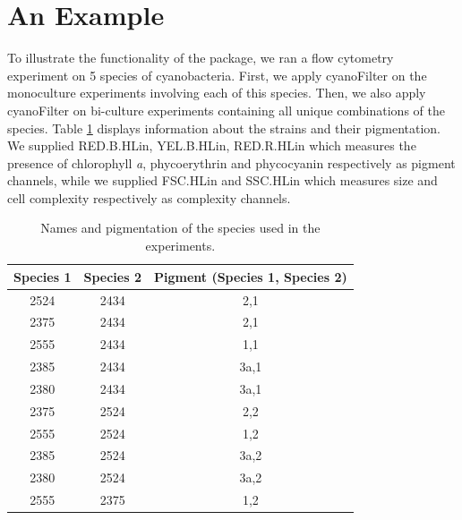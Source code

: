 \documentclass[a4paper,12pt]{extarticle}
\begin{document}


 
 \section*{An Example}
 
 To illustrate the functionality of the package, we ran a flow cytometry experiment on 5 species of cyanobacteria. First, we apply cyanoFilter on the monoculture experiments involving each of this species. Then, we also apply cyanoFilter on bi-culture experiments containing all unique combinations of the species. Table \ref{table:strains} displays information about the strains and their pigmentation. We supplied RED.B.HLin, YEL.B.HLin, RED.R.HLin which measures the presence of chlorophyll \textit{a}, phycoerythrin and phycocyanin respectively as pigment channels, while we supplied FSC.HLin and SSC.HLin which measures size and cell complexity respectively as complexity channels.
 
 \begin{table}[t] 
 		\centering
 			\begin{tabular}{ccc}
 				\hline
 				Species 1 & Species 2 & Pigment (Species 1, Species 2)\\
 				\hline
 				2524 & 2434 & 2,1\\
 				2375 & 2434 & 2,1\\
 				2555 & 2434 & 1,1\\
 				2385 & 2434 & 3a,1\\
 				2380 & 2434 & 3a,1\\
 				2375 & 2524 & 2,2\\
 				2555 & 2524 & 1,2\\
 				2385 & 2524 & 3a,2\\
 				2380 & 2524 & 3a,2\\
 				2555 & 2375 & 1,2\\
 				\hline
 		\end{tabular}
 	\caption{Names and pigmentation of the species used in the experiments.}
 	\label{table:strains}
 \end{table}
 
\end{document}
